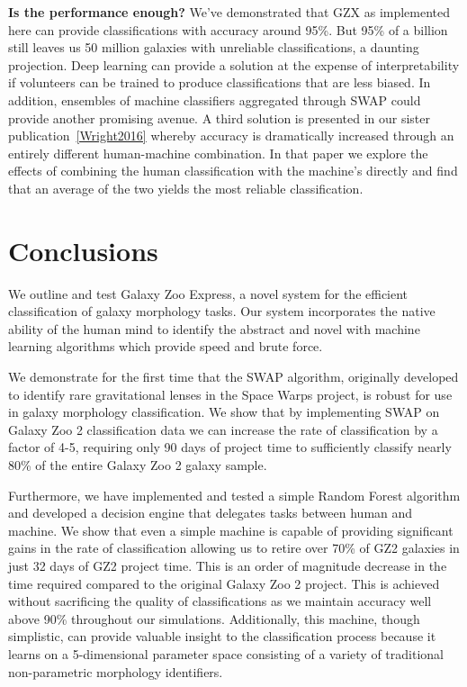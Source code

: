 \documentclass[twocolumn]{aastex6}
\begin{document}
\textbf{Is the performance enough?} We've demonstrated that GZX as implemented
here can provide classifications with accuracy around 95\%. But 95\% of a billion
still leaves us 50 million galaxies with unreliable classifications, a daunting projection.
Deep learning can provide a solution at the expense of interpretability if volunteers
can be trained to produce classifications that are less biased. In addition, ensembles
of machine classifiers aggregated through SWAP could provide another promising avenue.
A third solution is presented in our sister publication~\ref{Wright2016} whereby 
accuracy is dramatically increased through an entirely different human-machine 
combination. In that paper we explore the effects of combining the human 
classification with the machine's directly and find that an average of the two yields
the most reliable classification. 




\section{Conclusions}

We outline and test Galaxy Zoo Express, a novel system for the efficient classification 
of galaxy morphology tasks.  Our system incorporates the native ability of the human 
mind to identify the abstract and novel with machine learning algorithms which provide
 speed and brute force.  

We demonstrate for the first time that the SWAP algorithm, 
originally developed to identify rare gravitational lenses in the Space Warps project, 
is robust for use in galaxy morphology classification. We show that by implementing
SWAP on Galaxy Zoo 2 classification data we can increase the rate of classification by a factor
of 4-5, requiring only 90 days of project time to sufficiently classify nearly 80\% of the
entire Galaxy Zoo 2 galaxy sample. 

Furthermore, we have implemented and tested a simple Random Forest algorithm 
and developed a decision engine that delegates tasks between human and 
machine.  We show that even a simple machine is capable of providing significant 
gains in the rate of classification allowing us to retire over 70\% of GZ2 galaxies in 
just 32 days of GZ2 project time. This is an order of magnitude decrease in the time 
required compared to the original Galaxy Zoo 2 project. This is achieved without 
sacrificing the quality of classifications as we maintain accuracy well above 90\% 
throughout our simulations. 
Additionally, this machine, though simplistic, can provide valuable insight to the 
classification process because it learns on a 5-dimensional parameter space consisting 
of a variety of traditional non-parametric morphology identifiers. 
\end{document}
